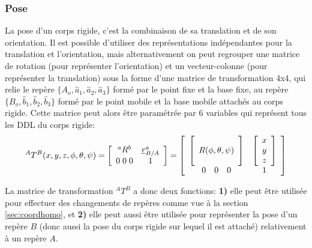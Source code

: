 \subsubsection{Pose}

La pose d'un corps rigide, c'est la combinaison de sa translation et de son orientation. Il est possible d'utiliser des représentations indépendantes pour la translation et l'orientation, mais alternativement on peut regrouper une matrice de rotation (pour représenter l'orientation) et un vecteur-colonne (pour représenter la translation)  sous la forme d'une matrice de transformation 4x4, qui relie le repère $\{A_o,\hat{a}_1,\hat{a}_2,\hat{a}_3\}$ formé par le point fixe et la base fixe, au repère $\{B_o,\hat{b}_1,\hat{b}_2,\hat{b}_3\}$ formé par le point mobile et la base mobile attachés au corps rigide. Cette matrice peut alors être paramétrée par 6 variables qui représent tous les DDL du corps rigide:
\begin{equation}
^{A}T^B(x,y,z,\phi,\theta,\psi) = \left[ \begin{array}{c c}
	^aR^b  & \underline{r}^a_{B/A} \\ 0 \; 0 \; 0 & 1
\end{array}  \right] = 
\left[ \begin{array}{c c}
\left[	\begin{array}{c} \\  R(\phi,\theta,\psi) \\ \\ \end{array} \right] & \left[ \begin{array}{c} x \\ y \\ z \end{array} \right] \\  \begin{array}{ccc} 0 & 0 & 0 \end{array}   &  1 
\end{array}  \right] 
\end{equation} 

La matrice de transformation $^{A}T^B$ a donc deux fonctions: \textbf{1)} elle peut être utilisée pour effectuer des changements de repères comme vue à la section \ref{sec:coordhomo}, et \textbf{2)} elle peut aussi être utilisée pour représenter la pose d'un repère $B$ (donc aussi la pose du corps rigide sur lequel il est attaché) relativement à un repère $A$.  


